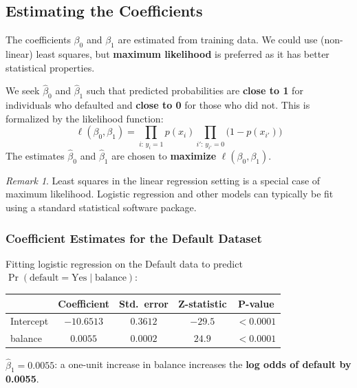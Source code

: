 \documentclass[11pt,a4paper]{article}
\theoremstyle{definition}
\theoremstyle{plain}
\theoremstyle{remark}
\newtheorem*{remark}{Remark}
\begin{document}
\subsection{Estimating the Coefficients}

The coefficients $\beta_0$ and $\beta_1$ are estimated from training data. We could use (non-linear) least squares, but \textbf{maximum likelihood} is preferred as it has better statistical properties.

\begin{tcolorbox}[colback=blue!5!white,colframe=blue!75!black,title=\textbf{The Likelihood Function}]
We seek $\hat{\beta}_0$ and $\hat{\beta}_1$ such that predicted probabilities are \textbf{close to 1} for individuals who defaulted and \textbf{close to 0} for those who did not. This is formalized by the likelihood function:
\[
    \ell(\beta_0, \beta_1) = \prod_{i:\, y_i = 1} p(x_i) \prod_{i':\, y_{i'} = 0} \bigl(1 - p(x_{i'})\bigr)
\]
The estimates $\hat{\beta}_0$ and $\hat{\beta}_1$ are chosen to \textbf{maximize} $\ell(\beta_0, \beta_1)$.
\end{tcolorbox}

\begin{remark}
Least squares in the linear regression setting is a special case of maximum likelihood. Logistic regression and other models can typically be fit using a standard statistical software package.
\end{remark}

\subsubsection{Coefficient Estimates for the Default Dataset}

Fitting logistic regression on the Default data to predict $\Pr(\text{default} = \text{Yes} \mid \text{balance})$:

\begin{center}
\begin{tabular}{lcccc}
\hline
 & Coefficient & Std.\ error & Z-statistic & P-value \\
\hline
Intercept & $-10.6513$ & $0.3612$ & $-29.5$ & $<0.0001$ \\
balance   & $0.0055$   & $0.0002$ & $24.9$  & $<0.0001$ \\
\hline
\end{tabular}
\end{center}

$\hat{\beta}_1 = 0.0055$: a one-unit increase in balance increases the \textbf{log odds of default by 0.0055}.
\end{document}
